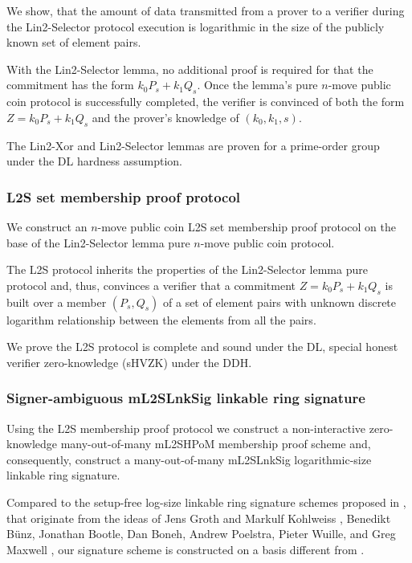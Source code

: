 \documentclass{mathcryptology} %
\theoremstyle{title}
\theoremstyle{titleof}
\begin{document}
    We show, that the amount of data transmitted from a prover to a verifier during the Lin2-Selector protocol execution is logarithmic in the size of the publicly known set of element pairs.

    With the Lin2-Selector lemma, no additional proof is required for that the commitment has the form $k_{0}P_{s}+k_{1}Q_{s}$. Once the lemma's pure $n$-move public coin protocol is successfully completed, the verifier is convinced of both the form $Z=k_{0}P_{s}+k_{1}Q_{s}$ and the prover's knowledge of $\left(k_{0}, k_{1}, s\right)$.

    The Lin2-Xor and Lin2-Selector lemmas are proven for a prime-order group under the DL hardness assumption.


\subsubsection{L2S set membership proof protocol}
    We construct an $n$-move public coin L2S set membership proof protocol on the base of the Lin2-Selector lemma pure $n$-move public coin protocol.

    The L2S protocol inherits the properties of the Lin2-Selector lemma pure protocol and, thus, convinces a verifier that a commitment $Z=k_{0}P_{s}+k_{1}Q_{s}$ is built over a member $\left(P_{s}, Q_{s}\right)$ of a set of element pairs with unknown discrete logarithm relationship between the elements from all the pairs.

    We prove the L2S protocol is complete and sound under the DL, special honest verifier zero-knowledge (sHVZK) under the DDH.


\subsubsection{Signer-ambiguous mL2SLnkSig linkable ring signature}
    Using the L2S membership proof protocol we construct a non-interactive zero-knowledge many-out-of-many mL2SHPoM membership proof scheme and, consequently, construct a many-out-of-many mL2SLnkSig logarithmic-size linkable ring signature.

    Compared to the setup-free log-size linkable ring signature schemes proposed in \cite{18,14,6,12}, that originate from the ideas of Jens Groth and Markulf Kohlweiss \cite{9}, Benedikt Bünz, Jonathan Bootle, Dan Boneh, Andrew Poelstra, Pieter Wuille, and Greg Maxwell \cite{2}, our signature scheme is constructed on a basis different from \cite{9,2}.
\end{document}
